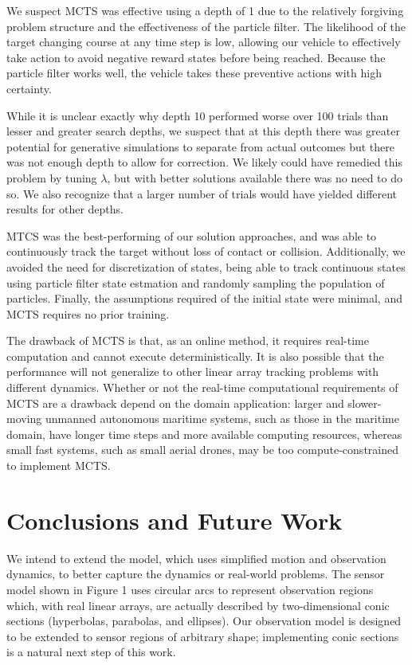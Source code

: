 \documentclass{article}
\begin{document}
We suspect MCTS was effective using a depth of 1 due to the relatively forgiving problem structure and the effectiveness of the particle filter. The likelihood of the target changing course at any time step is low, allowing our vehicle to effectively take action to avoid negative reward states before being reached. Because the particle filter works well, the vehicle takes these preventive actions with high certainty.

While it is unclear exactly why depth 10 performed worse over 100 trials than lesser and greater search depths, we suspect that at this depth there was greater potential for generative simulations to separate from actual outcomes but there was not enough depth to allow for correction.  We likely could have remedied this problem by tuning $\lambda$, but with better solutions available there was no need to do so. We also recognize that a larger number of trials would have yielded different results for other depths.

MTCS was the best-performing of our solution approaches, and was able to continuously track the target without loss of contact or collision. Additionally, we avoided the need for discretization of states, being able to track continuous states using particle filter state estmation and randomly sampling the population of particles. Finally, the assumptions required of the initial state were minimal, and MCTS requires no prior training.

The drawback of MCTS is that, as an online method, it requires real-time computation and cannot execute deterministically. It is also possible that the performance will not generalize to other linear array tracking problems with different dynamics. Whether or not the real-time computational requirements of MCTS are a drawback depend on the domain application: larger and slower-moving unmanned autonomous maritime systems, such as those in the maritime domain, have longer time steps and more available computing resources, whereas small fast systems, such as small aerial drones, may be too compute-constrained to implement MCTS.

\section{Conclusions and Future Work}
\par We intend to extend the model, which uses simplified motion and observation dynamics, to better capture the dynamics or real-world problems. The sensor model shown in Figure 1 uses circular arcs to represent observation regions which, with real linear arrays, are actually described by two-dimensional conic sections (hyperbolas, parabolas, and ellipses). Our observation model is designed to be extended to sensor regions of arbitrary shape; implementing conic sections is a natural next step of this work.
\end{document}
